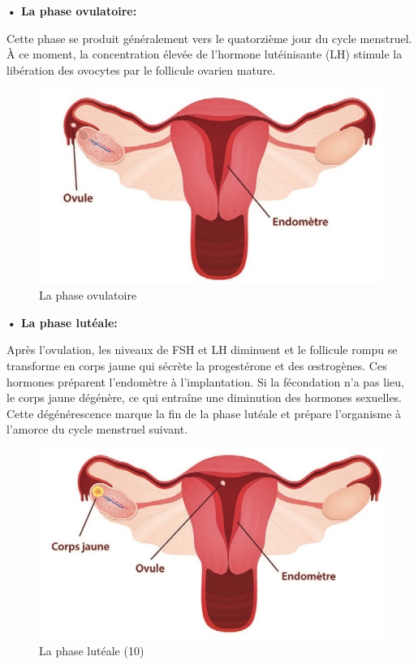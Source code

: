 \hspace{1em}\textbf{•	La phase ovulatoire:  } \vspace{.5em}

\noindent Cette phase se produit généralement vers le quatorzième jour du cycle menstruel. À ce moment, la concentration élevée de l'hormone lutéinisante (LH) stimule la libération des ovocytes par le follicule ovarien mature.

\begin{figure}[H]
  \centering
  \includegraphics{Images/fig_6.jpg}
  \caption{La phase ovulatoire}
\end{figure}

\hspace{1em}\textbf{•	La phase lutéale:} \vspace{.5em}

\noindent Après l’ovulation, les niveaux de FSH et LH diminuent et le follicule rompu se transforme en corps jaune qui sécrète la progestérone et des œstrogènes. Ces hormones préparent l’endomètre à l’implantation. Si la fécondation n’a pas lieu, le corps jaune dégénère, ce qui entraîne une diminution des hormones sexuelles. Cette dégénérescence marque la fin de la phase lutéale et prépare l’organisme à l’amorce du cycle menstruel suivant.   

\begin{figure}[H]
  \centering
  \includegraphics{Images/fig_7.jpg}
  \caption{La phase lutéale (10)}
\end{figure}

